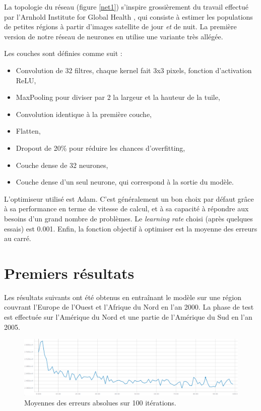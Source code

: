 \documentclass[a4paper, 11pt]{report}
\begin{document}
La topologie du réseau (figure \ref{net1}) s'inspire grossièrement du travail effectué par l'Arnhold Institute for Global Health \cite{netpop-article}, qui consiste à estimer les populations de petites régions à partir d'images satellite de jour \textit{et} de nuit. La première version de notre réseau de neurones en utilise une variante très allégée.

Les couches sont définies comme suit :
\begin{itemize}
	\item Convolution de 32 filtres, chaque kernel fait 3x3 pixels, fonction d'activation ReLU,
	\item MaxPooling pour diviser par 2 la largeur et la hauteur de la tuile,
	\item Convolution identique à la première couche,
	\item Flatten,
	\item Dropout de 20\% pour réduire les chances d'overfitting,
	\item Couche dense de 32 neurones,
	\item Couche dense d'un seul neurone, qui correspond à la sortie du modèle.
\end{itemize}

L'optimiseur utilisé est Adam. C'est généralement un bon choix par défaut grâce à sa performance en terme de vitesse de calcul, et à sa capacité à répondre aux besoins d'un grand nombre de problèmes. Le \textit{learning rate} choisi (après quelques essais) est 0.001. Enfin, la fonction objectif à optimiser est la moyenne des erreurs au carré.

\section{Premiers résultats}

Les résultats suivants ont été obtenus en entraînant le modèle sur une région couvrant l'Europe de l'Ouest et l'Afrique du Nord en l'an 2000. La phase de test est effectuée sur l'Amérique du Nord et une partie de l'Amérique du Sud en l'an 2005.

\begin{figure}
	\centering
	\includegraphics[width=1.0\textwidth]{img/mae1.png}
	\caption{Moyennes des erreurs absolues sur 100 itérations.}
	\label{mae1}
\end{figure}
\end{document}
